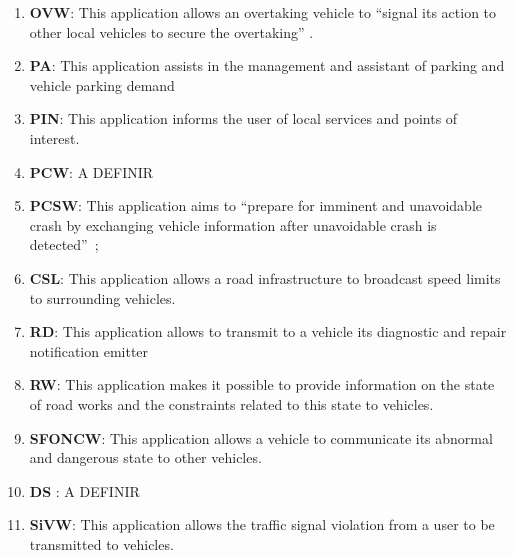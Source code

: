 \begin{enumerate}
\item \textbf{\acrfull{OVW}}: This application allows an overtaking vehicle to ``signal its action to other local vehicles to secure the overtaking'' \cite{etsi_etsi_tr_102_638_intelligent_2009,j_vehicle--vehicle_2014,karagiannis_vehicular_2011,mo_simulation_2018}.
\item \textbf{\acrfull{PA}}: This application assists in the management and assistant of parking and vehicle parking demand \cite{faria_smart_2017,boban_use_2017,ferreira_self-automated_2014,noauthor_intelligent_nodate}
\item \textbf{\acrfull{PIN}}: This application informs the user of local services and points of interest. \cite{etsi_etsi_tr_102_638_intelligent_2009}
\item \textbf{\acrfull{PCW}}: A DEFINIR \cite{al-sultan_comprehensive_2014}
\item \textbf{\acrfull{PCSW}}: This application aims to ``prepare for imminent and unavoidable crash by exchanging vehicle information after unavoidable crash is detected''~\cite{etsi_etsi_tr_102_638_intelligent_2009,papadimitratos_vehicular_2009,karagiannis_vehicular_2011,chang_intelligent_2010,cailean_survey_2014,xu_dsrc_2017,sewalkar_vehicle--pedestrian_2019,zeadally_tutorial_2020,swanson_crash_2016}; %
\item \textbf{\acrlong{CSL}}: This application allows a road infrastructure to broadcast speed limits to surrounding vehicles. \cite{etsi_etsi_tr_102_638_intelligent_2009,cailean_survey_2014, xu_dsrc_2017,noauthor_intelligent_nodate}
\item \textbf{\acrfull{RD}}: This application allows to transmit to a vehicle its diagnostic and repair notification emitter \cite{etsi_etsi_tr_102_638_intelligent_2009}
\item \textbf{\acrfull{RW}}: This application makes it possible to provide information on the state of road works and the constraints related to this state to vehicles. \cite{etsi_etsi_tr_102_638_intelligent_2009,brown_review_2019,noauthor_intelligent_nodate}
\item \textbf{\acrfull{SFONCW}}: This application allows a vehicle to communicate its abnormal and dangerous state to other vehicles. \cite{etsi_etsi_tr_102_638_intelligent_2009}
\item \textbf{\acrfull{DS}} \cite{etsi_etsi_tr_102_638_intelligent_2009}: A DEFINIR
\item \textbf{\acrfull{SiVW}}: This application allows the traffic signal violation from a user to be transmitted to vehicles. \cite{etsi_etsi_tr_102_638_intelligent_2009,papadimitratos_vehicular_2009,al-sultan_comprehensive_2014,cailean_survey_2014,xu_dsrc_2017,noauthor_intelligent_nodate}

\end{enumerate}
